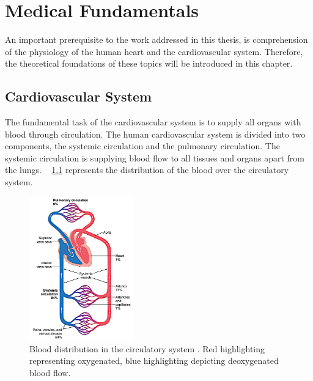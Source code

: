 \chapter{Medical Fundamentals}
 An important prerequisite to the work addressed in this thesis, is comprehension of the physiology of the human heart and the cardiovascular system. Therefore, the theoretical foundations of these topics will be introduced in this chapter.

\section{Cardiovascular System}
The fundamental task of the cardiovascular system is to supply all organs with blood through circulation. The human cardiovascular system is divided into two components, the systemic circulation and the pulmonary circulation. The systemic circulation is supplying blood flow to all tissues and organs apart from the lungs. \figurename~ \ref{fig:circulation} represents the distribution of the blood over the circulatory system.  \cite{GH20}
\begin{figure}[h]
  \centering
  \includegraphics[width=0.4\textwidth, height=0.6\textwidth]{images/circulation.jpg}
  \caption[Blood distribution in the ciculatory system \cite{GH20}]{Blood distribution in the circulatory system \cite{GH20}. Red highlighting representing oxygenated, blue highlighting depicting deoxygenated blood flow.}
  \label{fig:circulation}
\end{figure}
